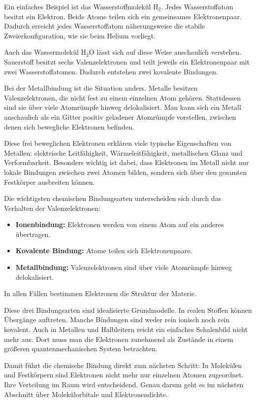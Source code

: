 Ein einfaches Beispiel ist das Wasserstoffmolekül \( \mathrm{H_2} \). Jedes
Wasserstoffatom besitzt ein Elektron. Beide Atome teilen sich ein gemeinsames
Elektronenpaar. Dadurch erreicht jedes Wasserstoffatom näherungsweise die
stabile Zweierkonfiguration, wie sie beim Helium vorliegt.

Auch das Wassermolekül \( \mathrm{H_2O} \) lässt sich auf diese Weise
anschaulich verstehen. Sauerstoff besitzt sechs Valenzelektronen und teilt
jeweils ein Elektronenpaar mit zwei Wasserstoffatomen. Dadurch entstehen zwei
kovalente Bindungen.

Bei der Metallbindung ist die Situation anders. Metalle besitzen
Valenzelektronen, die nicht fest zu einem einzelnen Atom gehören. Stattdessen
sind sie über viele Atomrümpfe hinweg delokalisiert. Man kann sich ein Metall
anschaulich als ein Gitter positiv geladener Atomrümpfe vorstellen, zwischen
denen sich bewegliche Elektronen befinden.

Diese frei beweglichen Elektronen erklären viele typische Eigenschaften von
Metallen: elektrische Leitfähigkeit, Wärmeleitfähigkeit, metallischen Glanz und
Verformbarkeit. Besonders wichtig ist dabei, dass Elektronen im Metall nicht
nur lokale Bindungen zwischen zwei Atomen bilden, sondern sich über den
gesamten Festkörper ausbreiten können.

\begin{PhysicsBox}
	\label{box:drei-bindungsarten-elektronen}
	Die wichtigsten chemischen Bindungsarten unterscheiden sich durch das Verhalten
	der Valenzelektronen:
	
	\begin{itemize}
		\item \textbf{Ionenbindung:} Elektronen werden von einem Atom auf ein anderes
		übertragen.
		\item \textbf{Kovalente Bindung:} Atome teilen sich Elektronenpaare.
		\item \textbf{Metallbindung:} Valenzelektronen sind über viele Atomrümpfe
		hinweg delokalisiert.
	\end{itemize}
	
	In allen Fällen bestimmen Elektronen die Struktur der Materie.
\end{PhysicsBox}

Diese drei Bindungsarten sind idealisierte Grundmodelle. In realen Stoffen
können Übergänge auftreten. Manche Bindungen sind weder rein ionisch noch rein
kovalent. Auch in Metallen und Halbleitern reicht ein einfaches Schalenbild
nicht mehr aus. Dort muss man die Elektronen zunehmend als Zustände in einem
größeren quantenmechanischen System betrachten.

Damit führt die chemische Bindung direkt zum nächsten Schritt: In Molekülen
und Festkörpern sind Elektronen nicht mehr nur einzelnen Atomen zugeordnet.
Ihre Verteilung im Raum wird entscheidend. Genau darum geht es im nächsten
Abschnitt über Molekülorbitale und Elektronendichte.